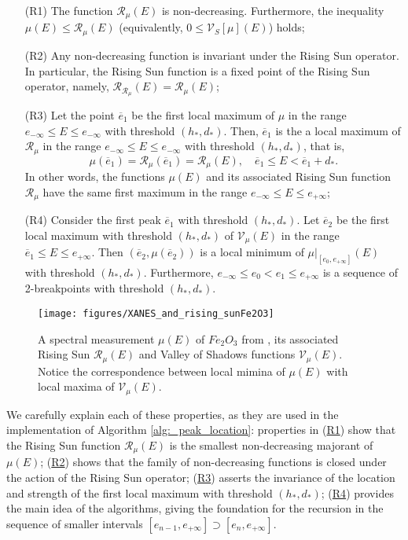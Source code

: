 \documentclass[%
 reprint,
 amsmath,amssymb,
 aps,
]{revtex4-1}
\begin{document}
\begin{enumerate}[label=\textnormal{(\arabic*)}]%
 \item[(R1)] \label{R1} The function $\mathcal{R}_{\mu}(E)$ is non-decreasing. Furthermore, the inequality  $\mu(E) \leq \mathcal{R}_{\mu}(E)$ (equivalently,  $ 0 \leq \mathcal{V}_{S}[\mu](E)$) holds;

   \item[(R2)]\label{R2} Any non-decreasing function is invariant under the Rising Sun operator. In particular, the Rising Sun function is a fixed point of the Rising Sun operator, namely, $\mathcal{R}_{\mathcal{R}_{\mu}}(E) = \mathcal{R}_{\mu}(E)$;

   \item[(R3)]\label{R3} 
  Let the point $\overline{e}_1$ be the first local maximum of $\mu$ in the range $e_{-\infty}\leq E\leq e_{-\infty}$ with  threshold $(h_*,d_*)$. Then, $\overline{e}_1$ is the a local maximum of $\mathcal{R}_{\mu}$ in the range $e_{-\infty}\leq E\leq e_{-\infty}$ with  threshold $(h_*,d_*)$, that is, 
%
$$\mu(\overline{e}_1)=\mathcal{R}_{\mu}(\overline{e}_1) = \mathcal{R}_{\mu}(E), \quad  \overline{e}_1 \leq E < \overline{e}_1 + d_*.$$ In other words, the functions $\mu(E)$ and its associated Rising Sun function $\mathcal{R}_{\mu}$ have the same first maximum in the range $e_{-\infty}\leq E\leq e_{+\infty}$;

\item[(R4)]\label{R4}  Consider the first peak $\overline{e}_1$ with threshold $(h_*, d_*)$. Let $\overline{e}_2$ be the first local maximum with threshold $(h_*,d_*)$ of $\mathcal{V}_{\mu}(E)$ in the range $\overline{e}_1\leq E\leq e_{+\infty}$. Then
%
$(\overline{e}_2,\mu(\overline{e}_2))$ is a local minimum of $\mu\Big|_{[e_0,e_{+\infty}]}(E)$ with threshold $(h_*,d_*)$. Furthermore, 
$e_{-\infty}\leq e_0<e_1\leq e_{+\infty}$ is a sequence of  2-breakpoints with threshold $(h_*,d_*)$.
%
\end{enumerate}
%

\begin{figure}[htb]
 \texttt{[image: figures/XANES\_and\_rising\_sunFe2O3]}
 \caption{A spectral measurement $\mu(E)$ of $Fe_2O_3$ from \cite{Asakura},
  its associated Rising Sun  $\mathcal{R}_{\mu}(E)$ and Valley of Shadows functions $\mathcal{V}_{\mu}(E)$. Notice the correspondence between local mimina of $\mu(E)$ with local maxima of $\mathcal{V}_{\mu}(E)$.\label{risign_sun_valley_of_shadows}}
\end{figure}
%
\noindent
We carefully explain each of these  properties, as they are used in the implementation of Algorithm \ref{alg:_peak_location}: properties in (\hyperref[R1]{R1}) show that the Rising Sun function $\mathcal{R}_{\mu}(E)$ is the smallest non-decreasing majorant of $\mu(E)$; (\hyperref[R3]{R2}) shows that the family of non-decreasing functions is closed under the action of the Rising Sun operator; (\hyperref[R4]{R3}) asserts the invariance of the location and strength of the first local maximum with threshold $(h_*,d_*)$;  (\hyperref[R4]{R4}) provides the main idea of the algorithms, giving the foundation for the recursion in the sequence of smaller intervals $[e_{n-1},e_{+\infty}]\supset[e_{n},e_{+\infty}]$.
%
\end{document}
